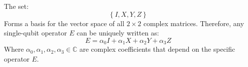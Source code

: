 \highspace
\begin{theorem}
    The set:
    \begin{equation*}
        \left\{I, X, Y, Z\right\}
    \end{equation*}
    Forms a basis for the vector space of all $2 \times 2$ complex matrices. Therefore, any single-qubit operator $E$ can be uniquely written as:
    \begin{equation}\label{eq:pauli-decomposition}
        E = \alpha_0 I + \alpha_1 X + \alpha_2 Y + \alpha_3 Z
    \end{equation}
    Where $\alpha_0, \alpha_1, \alpha_2, \alpha_3 \in \mathbb{C}$ are complex coefficients that depend on the specific operator $E$.
\end{theorem}

\newpage

